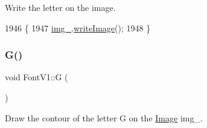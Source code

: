 Write the letter on the image. 


\begin{DoxyCode}
1946                           \{
1947     \mbox{\hyperlink{class_font_v1_a00569e3e3c4b70f437b63f396f735fb0}{img\_}}.\mbox{\hyperlink{class_image_ac34bdffd357a50025e6a72deb02596b5}{writeImage}}();
1948 \}
\end{DoxyCode}
\mbox{\label{class_font_v1_a9806041ba05556826ba6b4a0760fcee4}} 
\subsubsection{\texorpdfstring{G()}{G()}}
{\footnotesize\ttfamily void Font\+V1\+::G (\begin{DoxyParamCaption}{ }\end{DoxyParamCaption})}



Draw the contour of the letter G on the \mbox{\hyperlink{class_image}{Image}} img\+\_\+. 


